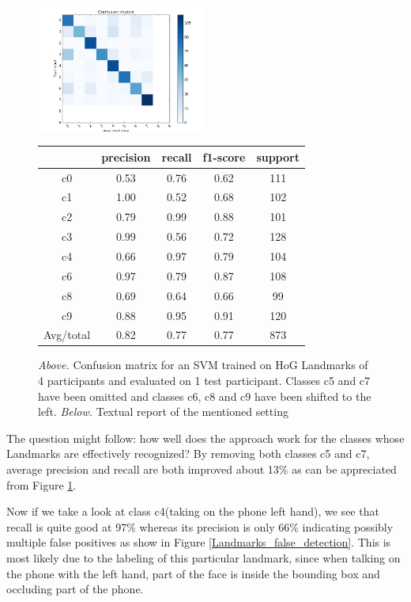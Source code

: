 \documentclass[10pt,twocolumn,letterpaper]{article}
\begin{document}
\begin{figure}[h]
	\centering
	\includegraphics[width=0.5\textwidth]{mult_HOG/4c01234689matComparable}
	\begin{tabular}{c||c|c|c|c}
		& precision&recall&f1-score&support\\	\hline
		c0&0.53&0.76&0.62&111\\
		c1&1.00&0.52&0.68&102\\
		c2&0.79&0.99&0.88&101\\
		c3&0.99&0.56&0.72&128\\
		c4&0.66&0.97&0.79&104\\
		c6&0.97&0.79&0.87&108\\
		c8&0.69&0.64&0.66&99\\
		c9&0.88&0.95&0.91&120\\ \hline
		Avg/total &0.82&0.77& 0.77 &873
	\end{tabular}
	\caption{\textit{Above.} Confusion matrix for an SVM trained on HoG Landmarks of 4 participants and evaluated on 1 test participant. Classes c5 and c7 have been omitted and classes c6, c8 and c9 have been shifted to the left. \textit{Below.} Textual report of the mentioned setting}
	\label{Landmarks_4no5no7}
\end{figure}

The question might follow: how well does the approach work for the classes whose Landmarks are effectively recognized? By removing both classes c5 and c7, average precision and recall are both improved about 13\% as can be appreciated from Figure \ref{Landmarks_4no5no7}. 

Now if we take a look at class c4(taking on the phone left hand), we see that recall is quite good at 97\% whereas its precision is only 66\% indicating possibly multiple false positives as show in Figure \ref{Landmarks_false_detection}. This is most likely due to the labeling of this particular landmark, since when talking on the phone with the left hand, part of the face is inside the bounding box and occluding part of the phone.
\end{document}
